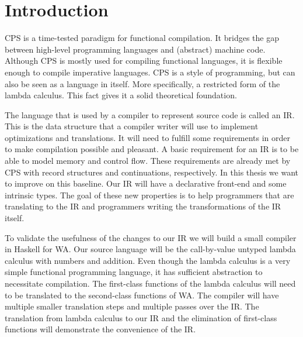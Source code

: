
\chapter{\label{chap:introduction}Introduction}

CPS is a time-tested paradigm for functional compilation\autocite{steele1978rabbit, DBLP:books/daglib/0022396}. It bridges the gap between high-level programming languages and (abstract) machine code. Although \ac{CPS} is mostly used for compiling functional languages, it is flexible enough to compile imperative languages. \ac{CPS} is a style of programming, but can also be seen as a language in itself. More specifically, a restricted form of the lambda calculus\autocite{barendregt1984lambda}. This fact gives it a solid theoretical foundation.

The language that is used by a compiler to represent source code is called an \ac{IR}. This is the data structure that a compiler writer will use to implement optimizations and translations. It will need to fulfill some requirements in order to make compilation possible and pleasant. A basic requirement for an \ac{IR} is to be able to model memory and control flow. These requirements are already met by \ac{CPS} with record structures and continuations, respectively. In this thesis we want to improve on this baseline. Our \ac{IR} will have a declarative front-end and some intrinsic types. The goal of these new properties is to help programmers that are translating to the \ac{IR} and programmers writing the transformations of the \ac{IR} itself.

To validate the usefulness of the changes to our \ac{IR} we will build a small compiler in Haskell\autocite{haskellhomepage} for \ac{WA}\autocite{webassemblyhomepage}. Our source language will be the call-by-value untyped lambda calculus with numbers and addition. Even though the lambda calculus is a very simple functional programming language, it has sufficient abstraction to necessitate compilation. The first-class functions of the lambda calculus will need to be translated to the second-class functions of \ac{WA}. The compiler will have multiple smaller translation steps and multiple passes over the \ac{IR}. The translation from lambda calculus to our \ac{IR} and the elimination of first-class functions will demonstrate the convenience of the \ac{IR}.

